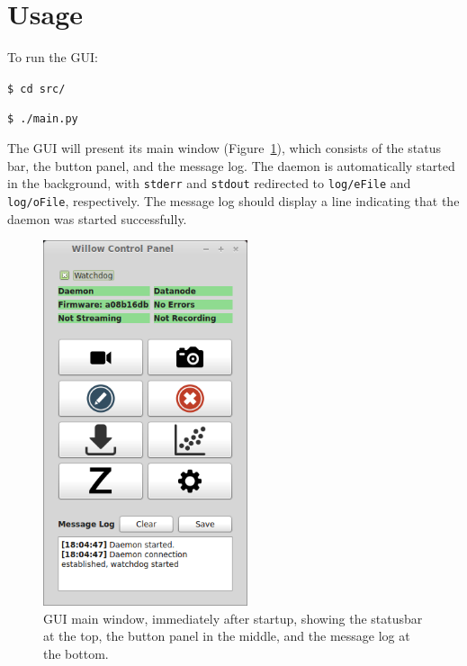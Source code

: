
\section{Usage}
\label{sec_usage}

To run the GUI:

\vspace{5mm}
\texttt{\$ cd src/}

\texttt{\$ ./main.py}
\vspace{5mm}

\noindent
The GUI will present its main window (Figure~\ref{fig_mainwindow}), which consists of the status bar, the button panel, and the message log. The daemon is automatically started in the background, with \texttt{stderr} and \texttt{stdout} redirected to \texttt{log/eFile} and \texttt{log/oFile}, respectively. The message log should display a line indicating that the daemon was started successfully.

\begin{figure}[h!]
\begin{center}
\includegraphics[width=6cm]{screenshots/mainwindow.png}
\end{center}
\caption{GUI main window, immediately after startup, showing the statusbar at the top, the button panel in the middle, and the message log at the bottom.}
\label{fig_mainwindow}
\end{figure}



